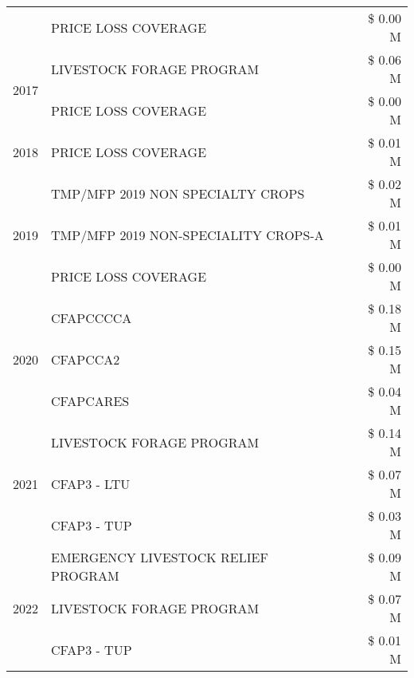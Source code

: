 \begin{tabular}{llr}
 & PRICE LOSS COVERAGE & \$ 0.00 M \\
\cline{1-3}
\multirow[t]{2}{*}{2017} & LIVESTOCK FORAGE PROGRAM & \$ 0.06 M \\
 & PRICE LOSS COVERAGE & \$ 0.00 M \\
\cline{1-3}
2018 & PRICE LOSS COVERAGE & \$ 0.01 M \\
\cline{1-3}
\multirow[t]{3}{*}{2019} & TMP/MFP 2019 NON SPECIALTY CROPS & \$ 0.02 M \\
 & TMP/MFP 2019 NON-SPECIALITY CROPS-A & \$ 0.01 M \\
 & PRICE LOSS COVERAGE & \$ 0.00 M \\
\cline{1-3}
\multirow[t]{3}{*}{2020} & CFAPCCCCA & \$ 0.18 M \\
 & CFAPCCA2 & \$ 0.15 M \\
 & CFAPCARES & \$ 0.04 M \\
\cline{1-3}
\multirow[t]{3}{*}{2021} & LIVESTOCK FORAGE PROGRAM & \$ 0.14 M \\
 & CFAP3 - LTU & \$ 0.07 M \\
 & CFAP3 - TUP & \$ 0.03 M \\
\cline{1-3}
\multirow[t]{3}{*}{2022} & EMERGENCY LIVESTOCK RELIEF PROGRAM & \$ 0.09 M \\
 & LIVESTOCK FORAGE PROGRAM & \$ 0.07 M \\
 & CFAP3 - TUP & \$ 0.01 M \\
\cline{1-3}
\bottomrule
\end{tabular}
